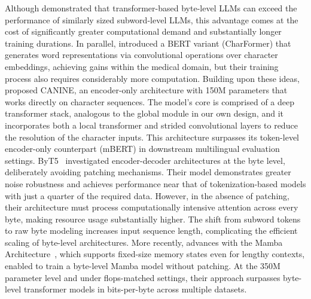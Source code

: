 Although \cite{Choe2019BridgingTG} demonstrated that transformer-based byte-level LLMs can exceed the performance of similarly sized subword-level LLMs, this advantage comes at the cost of significantly greater computational demand and substantially longer training durations. In parallel, \cite{el2020characterbert} introduced a BERT variant (CharFormer) that generates word representations via convolutional operations over character embeddings, achieving gains within the medical domain, but their training process also requires considerably more computation. Building upon these ideas, \cite{clark2022canine} proposed CANINE, an encoder-only architecture with 150M parameters that works directly on character sequences. The model’s core is comprised of a deep transformer stack, analogous to the global module in our own design, and it incorporates both a local transformer and strided convolutional layers to reduce the resolution of the character inputs. This architecture surpasses its token-level encoder-only counterpart (mBERT) in downstream multilingual evaluation settings. ByT5~\citep{xue2022byt5} investigated encoder-decoder architectures at the byte level, deliberately avoiding patching mechanisms. Their model demonstrates greater noise robustness and achieves performance near that of tokenization-based models with just a quarter of the required data. However, in the absence of patching, their architecture must process computationally intensive attention across every byte, making resource usage substantially higher. The shift from subword tokens to raw byte modeling increases input sequence length, complicating the efficient scaling of byte-level architectures. More recently, advances with the Mamba Architecture~\citep{gu2023mamba}, which supports fixed-size memory states even for lengthy contexts, enabled \cite{wang2024mambabyte} to train a byte-level Mamba model without patching. At the 350M parameter level and under flops-matched settings, their approach surpasses byte-level transformer models in bits-per-byte across multiple datasets.

